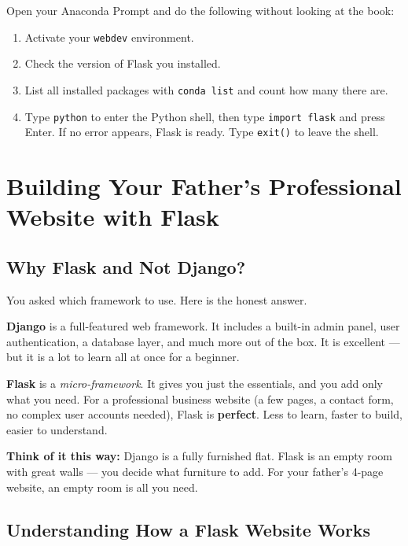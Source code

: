 \documentclass[12pt, a4paper]{book}
\begin{document}
\begin{tcolorbox}[taskbox]
Open your Anaconda Prompt and do the following without looking at the book:
\begin{enumerate}
  \item Activate your \texttt{webdev} environment.
  \item Check the version of Flask you installed.
  \item List all installed packages with \texttt{conda list} and count how many there are.
  \item Type \texttt{python} to enter the Python shell, then type \texttt{import flask} and press Enter.
    If no error appears, Flask is ready. Type \texttt{exit()} to leave the shell.
\end{enumerate}
\end{tcolorbox}


\chapter{Building Your Father's Professional Website with Flask}

\section{Why Flask and Not Django?}

You asked which framework to use. Here is the honest answer.

\textbf{Django} is a full-featured web framework. It includes a built-in admin panel,
user authentication, a database layer, and much more out of the box.
It is excellent --- but it is a lot to learn all at once for a beginner.

\textbf{Flask} is a \emph{micro-framework}. It gives you just the essentials,
and you add only what you need. For a professional business website
(a few pages, a contact form, no complex user accounts needed),
Flask is \textbf{perfect}. Less to learn, faster to build, easier to understand.

\begin{tcolorbox}[notebox]
\textbf{Think of it this way:} Django is a fully furnished flat.
Flask is an empty room with great walls --- you decide what furniture to add.
For your father's 4-page website, an empty room is all you need.
\end{tcolorbox}

\section{Understanding How a Flask Website Works}
\end{document}
